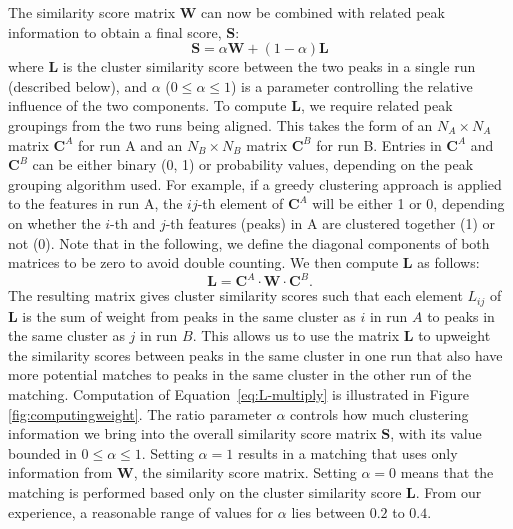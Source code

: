 The similarity score matrix $\mathbf{W}$ can now be combined with related peak information to obtain a final score, $\mathbf{S}$:
\begin{equation}\label{eq:combining-eq}
\boldsymbol{S}=\alpha \boldsymbol{W}+(1-\alpha)\boldsymbol{L}
\end{equation}
where $\boldsymbol{L}$ is the cluster similarity score between the two peaks in a single run (described below), and $\alpha$ ($0\leq\alpha\leq1$) is a parameter controlling the relative influence of the two components. To compute $\boldsymbol{L}$, we require related peak groupings from the two runs being aligned. This takes the form of an $N_A\times N_A$ matrix $\mathbf{C}^A$ for run A and an $N_B\times N_B$ matrix $\mathbf{C}^B$ for run B. Entries in $\boldsymbol{C}^A$ and $\boldsymbol{C}^B$ can be either binary (0, 1) or probability values, depending on the peak grouping algorithm used. For example, if a greedy clustering approach is applied to the features in run A, the $ij$-th element of $\mathbf{C}^A$ will be either 1 or 0, depending on whether the $i$-th and $j$-th features (peaks) in A are clustered together (1) or not (0). Note that in the following, we define the diagonal components of both matrices to be zero to avoid double counting. We then compute $\mathbf{L}$ as follows:
\begin{equation}\label{eq:L-multiply}
\boldsymbol{L}=\boldsymbol{C}^A \cdot \boldsymbol{W} \cdot \boldsymbol{C}^B.
\end{equation}
The resulting matrix gives cluster similarity scores such that each element $L_{ij}$ of $\boldsymbol{L}$ is the sum of weight from peaks in the same cluster as $i$ in run $A$ to peaks in the same cluster as $j$ in run $B$. This allows us to use the matrix $\boldsymbol{L}$ to upweight the similarity scores between peaks in the same cluster in one run that also have more potential matches to peaks in the same cluster in the other run of the matching. Computation of Equation~\ref{eq:L-multiply} is illustrated in Figure \ref{fig:computingweight}. The ratio parameter $\alpha$ controls how much clustering information we bring into the overall similarity score matrix $\boldsymbol{S}$, with its value bounded in $0\leq\alpha\leq1$. Setting $\alpha=1$ results in a matching that uses only information from $\boldsymbol{W}$, the similarity score matrix. Setting $\alpha=0$ means that the matching is performed based only on the cluster similarity score $\boldsymbol{L}$. From our experience, a reasonable range of values for $\alpha$ lies between $0.2$ to $0.4$.

